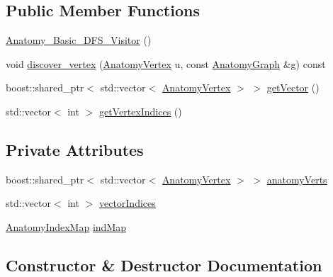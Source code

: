\subsection*{Public Member Functions}
\begin{DoxyCompactItemize}
\item 
\mbox{\hyperlink{class_anatomy___basic___d_f_s___visitor_ac0bad4df0cee8032fac56785830651b6}{Anatomy\+\_\+\+Basic\+\_\+\+D\+F\+S\+\_\+\+Visitor}} ()
\item 
void \mbox{\hyperlink{class_anatomy___basic___d_f_s___visitor_a718b8e46e3b31e6b046cc20dc1400054}{discover\+\_\+vertex}} (\mbox{\hyperlink{_body_graph_8hpp_aeb92fc7b3eed88cf25a4fc7b708a66cf}{Anatomy\+Vertex}} u, const \mbox{\hyperlink{_body_graph_8hpp_ab01b157c2e143191570b012d275fbf0d}{Anatomy\+Graph}} \&g) const
\item 
boost\+::shared\+\_\+ptr$<$ std\+::vector$<$ \mbox{\hyperlink{_body_graph_8hpp_aeb92fc7b3eed88cf25a4fc7b708a66cf}{Anatomy\+Vertex}} $>$ $>$ \mbox{\hyperlink{class_anatomy___basic___d_f_s___visitor_ad8e84fa450c5fb86f92d66adbeed782e}{get\+Vector}} ()
\item 
std\+::vector$<$ int $>$ \mbox{\hyperlink{class_anatomy___basic___d_f_s___visitor_aa4d4a9a684cd4ab15c965d3044530b76}{get\+Vertex\+Indices}} ()
\end{DoxyCompactItemize}
\subsection*{Private Attributes}
\begin{DoxyCompactItemize}
\item 
boost\+::shared\+\_\+ptr$<$ std\+::vector$<$ \mbox{\hyperlink{_body_graph_8hpp_aeb92fc7b3eed88cf25a4fc7b708a66cf}{Anatomy\+Vertex}} $>$ $>$ \mbox{\hyperlink{class_anatomy___basic___d_f_s___visitor_a0b28d945f501686b8037b49bb9ab75b2}{anatomy\+Verts}}
\item 
std\+::vector$<$ int $>$ \mbox{\hyperlink{class_anatomy___basic___d_f_s___visitor_a8e5871c69ac1e7ab736a2f31f3d35657}{vector\+Indices}}
\item 
\mbox{\hyperlink{_body_graph_8hpp_a9b727b123ee9682a6fc73a7785727450}{Anatomy\+Index\+Map}} \mbox{\hyperlink{class_anatomy___basic___d_f_s___visitor_a14840f6f0ba018b260db5d73e40fb326}{ind\+Map}}
\end{DoxyCompactItemize}


\subsection{Constructor \& Destructor Documentation}
\mbox{\label{class_anatomy___basic___d_f_s___visitor_ac0bad4df0cee8032fac56785830651b6}} 

